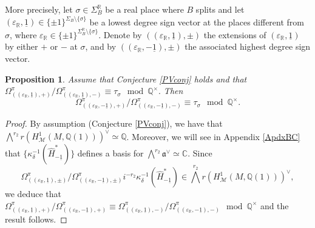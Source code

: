 \documentclass{amsart}
\newtheorem{proposition}[theorem]{Proposition}
\theoremstyle{definition}
\theoremstyle{remark}
\numberwithin{equation}{section}
\newcommand{\Q}{{\mathbb Q}}
\newcommand{\C}{{\mathbb C}}
\newcommand{\R}{{\mathbb R}}
\newcommand{\cM}{{\mathcal M}}
\begin{document}
More precisely, let $\sigma\in\Sigma_B^\R$ be a real place where $B$ splits and let   $(\varepsilon_\R,\underline 1) \in\{\pm 1\}^{\Sigma_B\setminus\{\sigma\}}$ be a lowest degree sign vector at the places different from $\sigma$, where $\varepsilon_\R\in\{\pm 1\}^{\Sigma_B^\R\setminus\{\sigma\}}$.  Denote by $((\varepsilon_\R,\underline{1}),\pm)$ the extensions of $(\varepsilon_\R,\underline 1)$ by either $+$ or $-$ at $\sigma$, and by $((\varepsilon_\R,-\underline 1),\pm)$ the associated highest degree sign vector.
\begin{proposition}
 Assume that Conjecture \ref{PVconj} holds and that
  $
\Omega^\pi_{((\varepsilon_\R,\underline 1),+)}/\Omega^\pi_{((\varepsilon_\R,\underline 1),-)}\equiv \tau_\sigma\mod \Q^\times.
    $
  Then
\[
\Omega^\pi_{  ((\varepsilon_\R,-\underline 1),+)}/\Omega^\pi_{  ((\varepsilon_\R,-\underline 1),-)}\equiv \tau_\sigma\mod \Q^\times.
\]
\end{proposition}
\begin{proof}
By assumption (Conjecture \ref{PVconj}), we have that  $\bigwedge^{r_2}r\left(H^1_{\cM}(M,\Q(1))\right)^\vee\simeq \Q$. Moreover, we will see in Appendix \ref{ApdxBC} that $\{\kappa_\delta^{-1}\left(\hat H_{-\underline 1}^\ast\right)\}$ defines a basis for $\bigwedge^{r_2}\mathfrak{a}^\vee\simeq \C$. Since
\[
\Omega^\pi_{((\varepsilon_\R,\underline 1),\pm)}/\Omega^\pi_{  ((\varepsilon_\R,-\underline 1),\pm)} i^{-r_2}\kappa_\delta^{-1}\left(\hat H_{{-\underline{1}}}^\ast\right)\in \bigwedge^{{r_2}}r\left(H^1_{\cM}(M,\Q(1))\right)^\vee,
 \]
 we deduce that $\Omega_{((\varepsilon_\R,\underline 1),+)}^\pi/\Omega_{{((\varepsilon_\R,-\underline 1),+)}}^\pi\equiv  \Omega_{((\varepsilon_\R,\underline 1),-)}^\pi/\Omega_{{((\varepsilon_\R,-\underline 1),-)}}^\pi\mod\Q^\times$ and the result follows.
 \end{proof}
\end{document}
